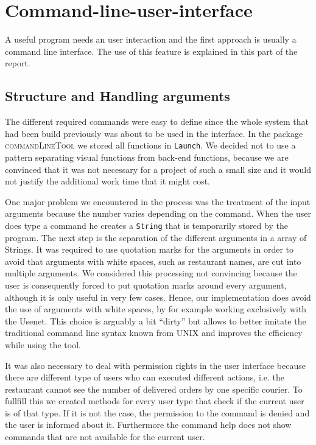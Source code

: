 \section{Command-line-user-interface}
\label{sec:command_line_user_interface}

A useful program needs an user interaction and the first approach is usually a command line 
interface. The use of this feature is explained in this part of the report.

\subsection{Structure and Handling arguments}
\label{sub:structure_and_handling_arguments}

The different required commands were easy to define since the whole system that had been build 
previously was about to be used in the interface. In the package \textsc{commandLineTool} we 
stored all functions in \lstinline|Launch|. We decided not to use a pattern separating
visual functions from back-end functions, because we are convinced that it was not necessary for a
project of such a small size and it would not justify the additional work time that it might 
cost.

One major problem we encountered in the process was the treatment of the input arguments because 
the number varies depending on the command. When the user does type a command he creates a 
\lstinline|String| that is temporarily stored by the program. The next step is the separation of 
the different arguments in a array of Strings. It was required to use quotation marks for the 
arguments in order to avoid that arguments with white spaces, such as restaurant names,  are cut
into multiple arguments.
We considered this processing not convincing because the user is consequently forced to put 
quotation marks around every argument, although it is only useful in very few cases. Hence, 
our implementation does avoid the use of arguments with white spaces, by for example working 
exclusively with the Usenet. This choice is arguably a bit ``dirty'' but allows to better 
imitate the traditional command line syntax known from \textsc{UNIX} and improves the efficiency 
while using the tool.

It was also necessary to deal with permission rights in the user interface because there are 
different type of users who can executed different actions, i.e. the restaurant cannot see
the number of delivered orders by one specific courier. To fullfill this we created methods for
every user type that check if the current user is of that type. If it is not the case, the 
permission to the command is denied and the user is informed about it. Furthermore the 
command help does not show commands that are not available for the current user.

